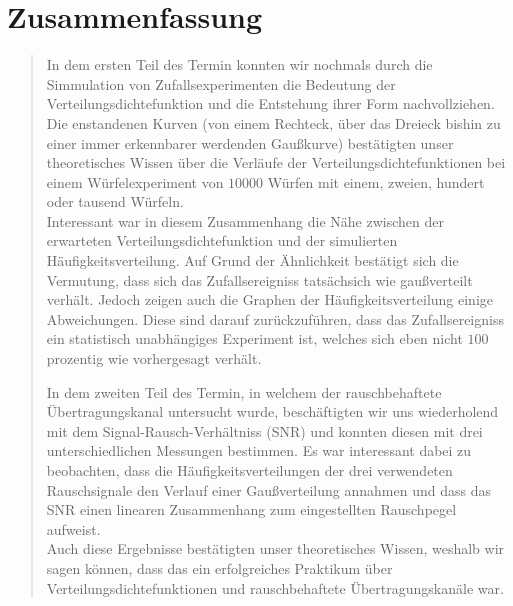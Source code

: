 \section{Zusammenfassung}
\begin{quote}
	In dem ersten Teil des Termin konnten wir nochmals durch die Simmulation von
	Zufallsexperimenten die Bedeutung der Verteilungsdichtefunktion
	und die Entstehung ihrer Form nachvollziehen. Die enstandenen Kurven (von einem
	Rechteck, über das Dreieck bishin zu einer immer erkennbarer werdenden
	Gaußkurve) bestätigten unser theoretisches Wissen über die Verläufe der
	Verteilungsdichtefunktionen bei einem Würfelexperiment von $10000$ Würfen mit einem, 
	zweien, hundert oder tausend Würfeln.\\
	Interessant war in diesem Zusammenhang die Nähe zwischen der erwarteten Verteilungsdichtefunktion und der simulierten
	Häufigkeitsverteilung. Auf Grund der Ähnlichkeit bestätigt sich die Vermutung,
	dass sich das Zufallsereigniss tatsächsich wie gaußverteilt verhält. Jedoch
	zeigen auch die Graphen der Häufigkeitsverteilung einige Abweichungen.
	Diese sind darauf zurückzuführen, dass das Zufallsereigniss ein statistisch unabhängiges Experiment ist, welches sich
	eben nicht $100$ prozentig wie vorhergesagt verhält.
	
	\vspace{1em}
	
	In dem zweiten Teil des Termin, in welchem der rauschbehaftete
	Übertragungskanal untersucht wurde, beschäftigten wir uns wiederholend mit dem 
	Signal-Rausch-Verhältniss (SNR) und konnten diesen mit drei unterschiedlichen
	Messungen bestimmen. Es war interessant dabei zu beobachten, dass die Häufigkeitsverteilungen der drei
	verwendeten Rauschsignale den Verlauf einer Gaußverteilung annahmen und dass
	das SNR einen linearen Zusammenhang zum eingestellten Rauschpegel aufweist.\\
	Auch diese Ergebnisse bestätigten unser theoretisches Wissen, weshalb wir sagen
	können, dass das ein erfolgreiches Praktikum über Verteilungsdichtefunktionen
	und rauschbehaftete Übertragungskanäle war.
	
\end{quote}


